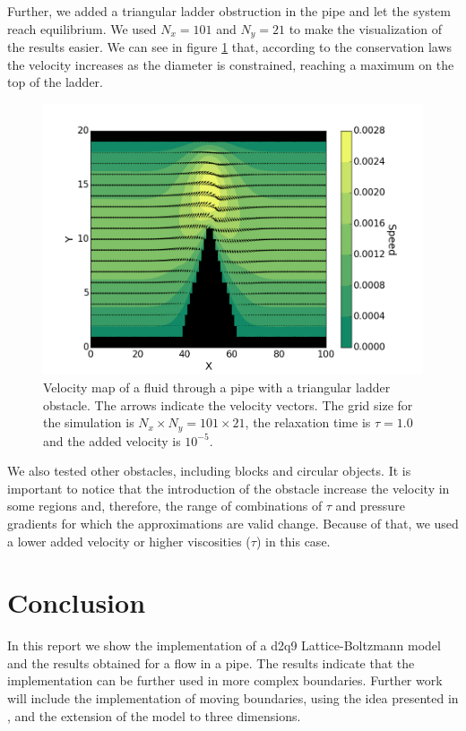 \documentclass[aps,prl,reprint,groupedaddress]{revtex4-1}
\begin{document}
Further, we added a triangular ladder obstruction in the pipe and let the system reach equilibrium. We used $N_x=101$ and $N_y=21$ to make the visualization of the results easier. We can see in figure \ref{arrows} that, according to the conservation laws the velocity increases as the diameter is constrained, reaching a maximum on the top of the ladder.

\begin{figure}[ht]
	\includegraphics[scale=0.4]{arrows.png}
	\caption{Velocity map of a fluid through a pipe with a triangular ladder obstacle. The arrows indicate the velocity vectors. The grid size for the simulation is $N_x \times N_y = 101 \times 21$, the relaxation time is $\tau=1.0$ and the added velocity is $10^{-5}$. \label{arrows}}
\end{figure}

We also tested other obstacles, including blocks and circular objects. It is important to notice that the introduction of the obstacle increase the velocity in some regions and, therefore, the range of combinations of $\tau$ and pressure gradients for which the approximations are valid change. Because of that, we used a lower added velocity or higher viscosities ($\tau$) in this case.

\section{Conclusion \label{conclusion}}

In this report we show the implementation of a d2q9 Lattice-Boltzmann model and the results obtained for a flow in a pipe. The results indicate that the implementation can be further used in more complex boundaries. Further work will include the implementation of moving boundaries, using the idea presented in \cite{Kang2008}, and the extension of the model to three dimensions.

\end{document}
